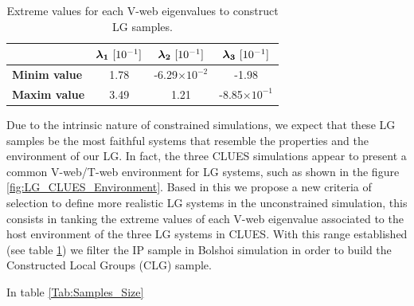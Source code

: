\documentclass[usenatbib]{latex/mn2e}
\begin{document}
\begin{table}
  \centering
  \begin{tabular}{l | c c c} \hline
	& $\boldsymbol{ \lambda_{1} }\ [10^{-1}]$ & $\boldsymbol{ \lambda_{2} }\ [10^{-1}]$  & $\boldsymbol{ \lambda_{3} }\ [10^{-1}]$ \\ \hline
	\textbf{Minim value} & 1.78 & -6.29$\times 10^{-2}$ & -1.98 \\
	\textbf{Maxim value} & 3.49 & 1.21 & -8.85$\times 10^{-1}$ \\ \hline
  \end{tabular}
  
  \caption{Extreme values for each V-web eigenvalues to construct LG 
  samples.}
  
  \label{Tab:Lambdas_LG}
\end{table}


Due to the intrinsic nature of constrained simulations, we expect that 
these LG samples be the most faithful systems that resemble the properties
and the environment of our LG. In fact, the three CLUES simulations appear 
to present a common V-web/T-web environment for LG systems, such as shown 
in the figure \ref{fig:LG_CLUES_Environment}. Based in this we propose a 
new criteria of selection to define more realistic LG systems in the
unconstrained simulation, this consists in tanking the extreme values of 
each V-web eigenvalue associated to the host environment of the three 
LG systems in CLUES. With this range established (see table 
\ref{Tab:Lambdas_LG}) we filter the IP sample in Bolshoi simulation in 
order to build the Constructed Local Groups (CLG) sample.


In table \ref{Tab:Samples_Size}
\end{document}
